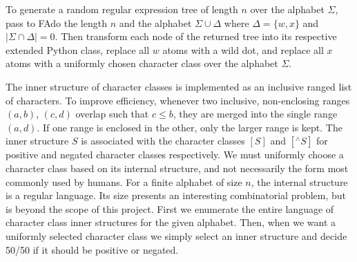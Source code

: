 To generate a random regular expression tree of length $n$ over the alphabet $\Sigma$, pass to FAdo the length $n$ and the alphabet $\Sigma \cup \Delta$ where $\Delta = \{w, x\}$ and $|\Sigma \cap \Delta|=0$. Then transform each node of the returned tree into its respective extended Python class, replace all $w$ atoms with a wild dot, and replace all $x$ atoms with a uniformly chosen character class over the alphabet $\Sigma$.

The inner structure of character classes is implemented as an inclusive ranged list of characters. To improve efficiency, whenever two inclusive, non-enclosing ranges $(a, b)$, $(c, d)$ overlap such that $c \leq b$, they are merged into the single range $(a, d)$. If one range is enclosed in the other, only the larger range is kept. The inner structure $S$ is associated with the character classes $[S]$ and $[^\wedge S]$ for positive and negated character classes respectively. We must uniformly choose a character class based on its internal structure, and not necessarily the form most commonly used by humans. For a finite alphabet of size $n$, the internal structure is a regular language. Its size presents an interesting combinatorial problem, but is beyond the scope of this project. First we enumerate the entire language of character class inner structures for the given alphabet. Then, when we want a uniformly selected character class we simply select an inner structure and decide 50/50 if it should be positive or negated.

